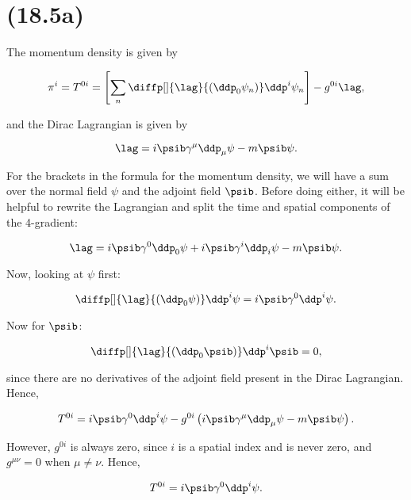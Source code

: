 \section{(18.5a)}

The momentum density is given by

\begin{equation}
    \pi^i = T^{0i} = \left[ \sum_n \diffp[]{\lag}{(\ddp_0 \psi_n)}\ddp^i \psi_n \right] - g^{0i}\lag,
\end{equation}

and the Dirac Lagrangian is given by

\begin{equation}
    \lag = i\psib\gamma^{\mu}\ddp_{\mu}\psi - m\psib\psi.
\end{equation}

For the brackets in the formula for the momentum density, we will have a sum over the normal field $\psi$ and the adjoint field $\psib$. Before doing either, it will be helpful to rewrite the Lagrangian and split the time and spatial components of the 4-gradient:

\begin{equation*}
    \lag = i\psib\gamma^0\ddp_0\psi + i\psib\gamma^i\ddp_i\psi - m\psib\psi.
\end{equation*}

Now, looking at $\psi$ first:

\begin{equation*}
    \diffp[]{\lag}{(\ddp_0 \psi)}\ddp^i \psi = i\psib\gamma^0\ddp^i\psi.
\end{equation*}

Now for $\psib$:

\begin{equation*}
    \diffp[]{\lag}{(\ddp_0 \psib)}\ddp^i \psib = 0,
\end{equation*}

since there are no derivatives of the adjoint field present in the Dirac Lagrangian. Hence,

\begin{equation*}
    T^{0i} = i\psib\gamma^0\ddp^i\psi - g^{0i}\left( i\psib\gamma^{\mu}\ddp_{\mu}\psi - m\psib\psi \right).
\end{equation*}

However, $g^{0i}$ is always zero, since $i$ is a spatial index and is never zero, and $g^{\mu\nu}=0$ when $\mu\neq\nu$. Hence,

\begin{equation*}
    T^{0i} = i\psib\gamma^0\ddp^i\psi.
\end{equation*}